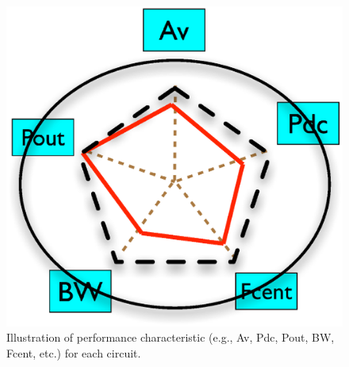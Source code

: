       \begin{figure}[t]
        \centering
        \includegraphics[width=\textwidth]{Fig/MultiSpec.eps}
        \caption{Illustration of performance characteristic (e.g., Av, Pdc, Pout, BW, Fcent, etc.) for each circuit.} 
        \label{fig:MultiSpec}
      \end{figure}



